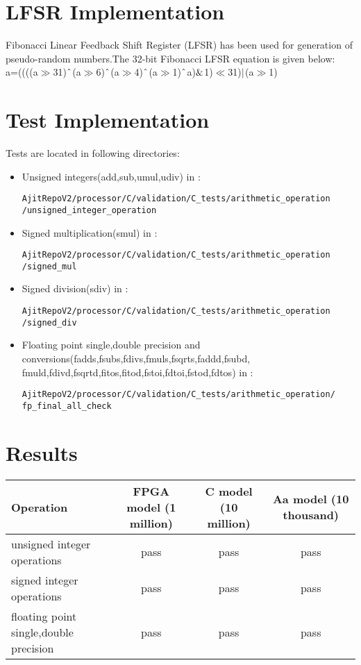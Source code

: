 \documentclass[12pt]{article}
\newcommand\XOR{\mathbin{\char`\^}}
\newcommand\AND{\mathbin{\char`\&}}
\newcommand\OR{\mathbin{\char`\|}}
\begin{document}
\section*{LFSR Implementation}
Fibonacci Linear Feedback Shift Register (LFSR) has been used for generation of pseudo-random numbers.The 32-bit Fibonacci LFSR equation is given below:\\
a=((((a$\gg$31)$\XOR$(a$\gg$6)$\XOR$(a$\gg$4)$\XOR$(a$\gg$1)$\XOR$a)$\AND$1)$\ll$31)$\OR$(a$\gg$1)

\section*{Test Implementation}
Tests are located in following directories:
\begin{itemize}
  \item Unsigned integers(add,sub,umul,udiv) in :
\begin{lstlisting}
AjitRepoV2/processor/C/validation/C_tests/arithmetic_operation
/unsigned_integer_operation
\end{lstlisting}
\item Signed multiplication(smul) in :
\begin{lstlisting}
AjitRepoV2/processor/C/validation/C_tests/arithmetic_operation
/signed_mul
\end{lstlisting}
\item Signed division(sdiv) in :
\begin{lstlisting}
AjitRepoV2/processor/C/validation/C_tests/arithmetic_operation
/signed_div
\end{lstlisting}
\item Floating point single,double precision and conversions(fadds,fsubs,fdivs,fmuls,fsqrts,faddd,fsubd,\\
fmuld,fdivd,fsqrtd,fitos,fitod,fstoi,fdtoi,fstod,fdtos) in :
\begin{lstlisting}
AjitRepoV2/processor/C/validation/C_tests/arithmetic_operation/
fp_final_all_check
\end{lstlisting}
\end{itemize}
\section*{Results}

\begin{tabular}{|p{5cm}|c|c|c|}
  \hline
 \textbf{Operation} & \parbox[t]{3cm}{\textbf{FPGA model (1 million)}} & \parbox[t]{3cm}{\textbf{C model (10 million)}} & \parbox[t]{3cm} {\textbf{Aa model (10 thousand)}}\\
  \hline
  unsigned integer operations & pass & pass & pass\\
  \hline
  signed integer operations & pass & pass & pass\\
   \hline
  floating point single,double precision & pass & pass & pass\\
  \hline
\end{tabular}
\end{document}
